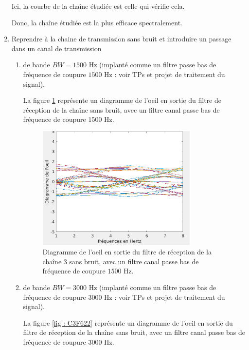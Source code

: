 \documentclass[frenchb]{article}
\begin{document}
\begin{enumerate}
		Ici, la courbe de la chaîne étudiée est celle qui vérifie cela.
		
		Donc, la chaîne étudiée est la plus efficace spectralement.
		\par\leavevmode\par
        \item Reprendre à la chaine de transmission sans bruit et introduire un passage dans un canal de transmission
            \begin{enumerate}
                \item de bande $BW=1500$ Hz (implanté comme un filtre passe bas de fréquence de coupure $1500$ Hz : voir TPs et projet de traitement du signal).
                \par\leavevmode\par
                \setlength\parindent{0.5cm}
                La figure \ref{fig : C3F621} représente un diagramme de l'oeil en sortie du filtre de réception de la chaîne sans bruit, avec un filtre canal passe bas de fréquence de coupure $1500$ Hz.
                \begin{figure}[ht!]
				\centering
				\includegraphics[width=8cm]{C3F621.png}		              	\caption{Diagramme de l'oeil en sortie du filtre de réception de la chaîne 3 sans bruit, avec un filtre canal passe bas de fréquence de coupure $1500$ Hz. \label{fig : C3F621}}
				\end{figure}
				\par\leavevmode\par
                \item de bande $BW=3000$ Hz (implanté comme un filtre passe bas de fréquence de coupure $3000$ Hz : voir TPs et projet de traitement du signal).
                \par\leavevmode\par
                \setlength\parindent{0.5cm}
                La figure \ref{fig : C3F622} représente un diagramme de l'oeil en sortie du filtre de réception de la chaîne sans bruit, avec un filtre canal passe bas de fréquence de coupure $3000$ Hz.

\end{enumerate}
\end{enumerate}
\end{document}
